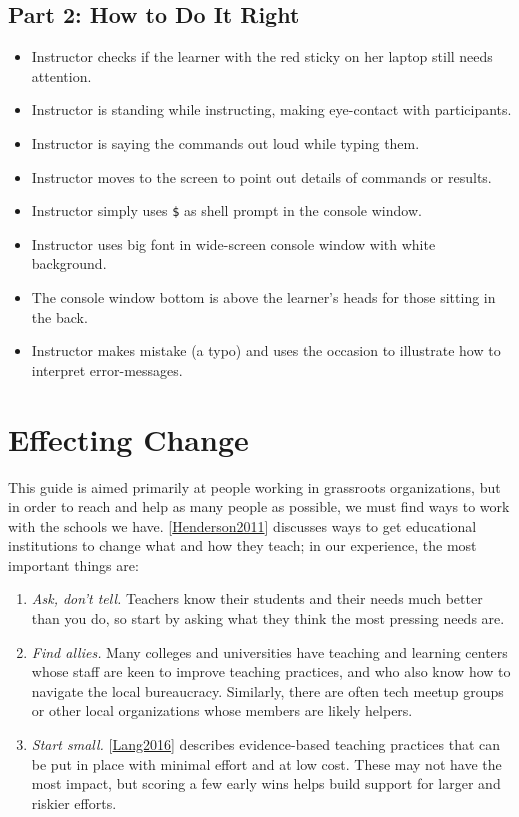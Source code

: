 \documentclass[10pt,statementpaper]{memoir}
\begin{document}
\subsection{Part 2: How to Do It Right}\label{part-2-how-to-do-it-right}

\begin{itemize}
\item
  Instructor checks if the learner with the red sticky on her laptop
  still needs attention.
\item
  Instructor is standing while instructing, making eye-contact with
  participants.
\item
  Instructor is saying the commands out loud while typing them.
\item
  Instructor moves to the screen to point out details of commands or
  results.
\item
  Instructor simply uses \texttt{\$} as shell prompt in the console
  window.
\item
  Instructor uses big font in wide-screen console window with white
  background.
\item
  The console window bottom is above the learner's heads for those
  sitting in the back.
\item
  Instructor makes mistake (a typo) and uses the occasion to illustrate
  how to interpret error-messages.
\end{itemize}

\section{Effecting Change}\label{effecting-change}

This guide is aimed primarily at people working in grassroots
organizations, but in order to reach and help as many people as
possible, we must find ways to work with the schools we have.
{[}\href{biblio.html\#henderson-facilitating}{Henderson2011}{]}
discusses ways to get educational institutions to change what and how
they teach; in our experience, the most important things are:

\begin{enumerate}
\def\labelenumi{\arabic{enumi}.}
\item
  \emph{Ask, don't tell.} Teachers know their students and their needs
  much better than you do, so start by asking what they think the most
  pressing needs are.
\item
  \emph{Find allies.} Many colleges and universities have teaching and
  learning centers whose staff are keen to improve teaching practices,
  and who also know how to navigate the local bureaucracy. Similarly,
  there are often tech meetup groups or other local organizations whose
  members are likely helpers.
\item
  \emph{Start small.}
  {[}\href{biblio.html\#lang-small-teaching}{Lang2016}{]} describes
  evidence-based teaching practices that can be put in place with
  minimal effort and at low cost. These may not have the most impact,
  but scoring a few early wins helps build support for larger and
  riskier efforts.
\end{enumerate}
\end{document}
